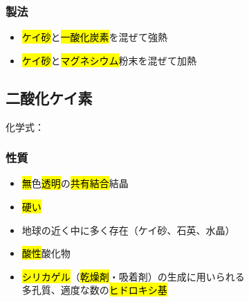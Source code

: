 \subsubsection{製法}
\begin{itemize}
  \item \hl{ケイ砂}と\hl{一酸化炭素}を混ぜて強熱 \K\\
  \item \hl{ケイ砂}と\hl{マグネシウム}粉末を混ぜて加熱\\
\end{itemize}
\subsection{二酸化ケイ素}
化学式：\hl{}
\subsubsection{性質}
\begin{itemize}
  \item \hl{無}色\hl{透明}の\hl{共有結合}結晶
  \item \hl{硬い}
  \item 地球の近く中に多く存在（ケイ砂、石英、水晶）
  \item \hl{酸性}酸化物
  \item \hl{シリカゲル}（\hl{乾燥剤}・吸着剤）の生成に用いられる\\
        多孔質、適度な数の\hl{ヒドロキシ基}
\end{itemize}
